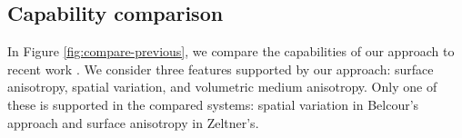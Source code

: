 \subsection{Capability comparison}
In Figure \ref{fig:compare-previous}, we compare the capabilities of our approach to recent work \cite{Zeltner2018,Belcour2018}. We consider three features supported by our approach: surface anisotropy, spatial variation, and volumetric medium anisotropy. Only one of these is supported in the compared systems: spatial variation in Belcour's approach and surface anisotropy in Zeltner's.




